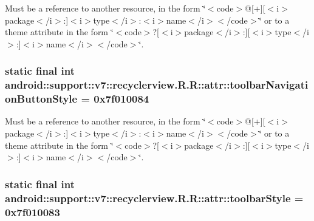 Must be a reference to another resource, in the form \char`\"{}$<$code$>$@\mbox{[}+\mbox{]}\mbox{[}$<$i$>$package$<$/i$>$:\mbox{]}$<$i$>$type$<$/i$>$:$<$i$>$name$<$/i$>$$<$/code$>$\char`\"{} or to a theme attribute in the form \char`\"{}$<$code$>$?\mbox{[}$<$i$>$package$<$/i$>$:\mbox{]}\mbox{[}$<$i$>$type$<$/i$>$:\mbox{]}$<$i$>$name$<$/i$>$$<$/code$>$\char`\"{}. \hypertarget{classandroid_1_1support_1_1v7_1_1recyclerview_1_1_r_1_1attr_e0e1ce28bc8191269b1653b4d5e3ad3a}{
\subsubsection[{toolbarNavigationButtonStyle}]{\setlength{\rightskip}{0pt plus 5cm}static final int android::support::v7::recyclerview.R.R::attr::toolbarNavigationButtonStyle = 0x7f010084}}
\label{classandroid_1_1support_1_1v7_1_1recyclerview_1_1_r_1_1attr_e0e1ce28bc8191269b1653b4d5e3ad3a}


Must be a reference to another resource, in the form \char`\"{}$<$code$>$@\mbox{[}+\mbox{]}\mbox{[}$<$i$>$package$<$/i$>$:\mbox{]}$<$i$>$type$<$/i$>$:$<$i$>$name$<$/i$>$$<$/code$>$\char`\"{} or to a theme attribute in the form \char`\"{}$<$code$>$?\mbox{[}$<$i$>$package$<$/i$>$:\mbox{]}\mbox{[}$<$i$>$type$<$/i$>$:\mbox{]}$<$i$>$name$<$/i$>$$<$/code$>$\char`\"{}. \hypertarget{classandroid_1_1support_1_1v7_1_1recyclerview_1_1_r_1_1attr_3022654176541f240d5849243ab4d1a3}{
\subsubsection[{toolbarStyle}]{\setlength{\rightskip}{0pt plus 5cm}static final int android::support::v7::recyclerview.R.R::attr::toolbarStyle = 0x7f010083}}
\label{classandroid_1_1support_1_1v7_1_1recyclerview_1_1_r_1_1attr_3022654176541f240d5849243ab4d1a3}


